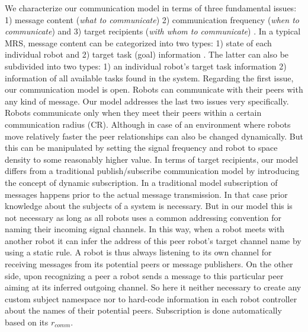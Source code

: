 \documentclass[letterpaper, 10 pt, conference]{ieeeconf}  %
\begin{document}
We characterize our communication model in terms of three fundamental issues: 1) message content ({\em what to communicate}) 2) communication frequency ({\em when to communicate})  and 3) target recipients ({\em with whom to communicate})  \cite{Gerkey}. In a typical MRS, message content can be categorized into two types: 1) state of each individual robot  and 2) target task (goal) information \cite{Balch}. The latter can also be subdivided into two types: 1) an individual robot's target task  information 2) information of all available tasks found in the system. Regarding the first issue, our communication model is open. Robots can communicate with their peers with any kind of message. Our model addresses the last two issues very specifically. Robots  communicate only when they meet their peers within a certain communication radius (CR). Although in case of an environment where robots move relatively faster the peer relationships can also be changed dynamically. But  this can be manipulated by setting  the signal frequency and robot to space density to some reasonably higher value. In terms of target recipients, our model differs from a traditional publish/subscribe communication model by introducing the concept of dynamic subscription. In a traditional model subscription of messages happens prior to the actual message transmission. In that case prior knowledge about the subjects of a system is necessary. But in our model this is not necessary as long as all robots uses a common addressing convention for  naming their incoming  signal channels. In this way, when a robot meets with another robot it can infer the address of this peer robot's target  channel name by using a static rule.  A robot is thus always listening to its own channel for receiving messages from its potential peers or message publishers. On the other side, upon recognizing a peer a robot sends a message to this particular peer aiming at its inferred outgoing channel. So here it neither necessary to create any custom subject namespace nor to hard-code information in each robot controller about the names of their potential peers. Subscription is done automatically based on its  $r_{comm}$.
\end{document}
